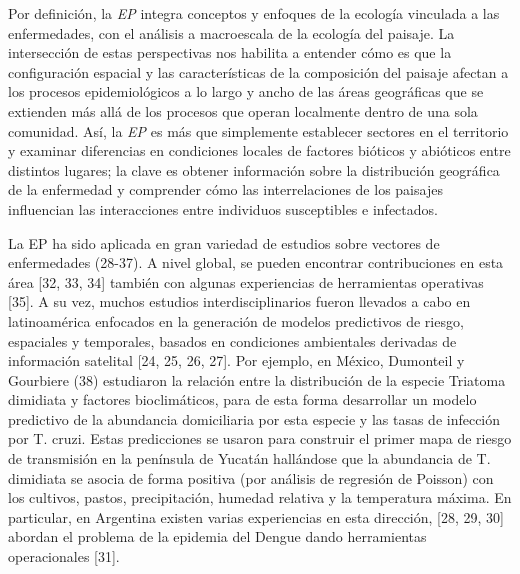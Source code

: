 \par Por definición, la \textit{EP} integra conceptos y
  enfoques de la ecología vinculada a las enfermedades, con el análisis a
  macroescala de la ecología del paisaje. La intersección de estas perspectivas
  nos habilita a entender cómo es que la configuración espacial y las
  características de la composición del paisaje afectan a los procesos
  epidemiológicos a lo largo y ancho de las áreas geográficas que se
  extienden más allá de los procesos que operan localmente dentro de una sola comunidad.
  Así, la \textit{EP} es más que simplemente establecer
  sectores en el territorio y examinar diferencias en condiciones locales de
  factores bióticos y abióticos entre distintos lugares; la clave es obtener
  información sobre la distribución geográfica de la enfermedad y comprender
  cómo las interrelaciones de los paisajes influencian las interacciones entre
  individuos susceptibles e infectados.

\par La EP ha sido aplicada en gran variedad de estudios sobre vectores de
  enfermedades (28-37). A nivel global, se pueden encontrar contribuciones en esta área
  [32, 33, 34] también con algunas experiencias de herramientas operativas [35].
  A su vez, muchos estudios interdisciplinarios fueron llevados a cabo en
  latinoamérica enfocados en la generación de modelos predictivos de riesgo,
  espaciales y temporales, basados en condiciones ambientales derivadas de
  información satelital [24, 25, 26, 27].
  Por ejemplo, en México, Dumonteil y Gourbiere (38)
  estudiaron la relación entre la distribución de la especie Triatoma dimidiata
  y factores bioclimáticos, para de esta forma desarrollar un modelo predictivo de
  la abundancia domiciliaria por esta especie y las tasas de infección
  por T. cruzi. Estas predicciones se usaron para construir el primer mapa de
  riesgo de transmisión en la península de Yucatán hallándose que la abundancia de T.
  dimidiata se asocia de forma positiva (por análisis de regresión de Poisson)
  con los cultivos, pastos, precipitación, humedad relativa y la temperatura
  máxima. En particular, en Argentina existen varias experiencias en esta
  dirección, [28, 29, 30] abordan el problema de la epidemia del Dengue dando
  herramientas operacionales [31].

